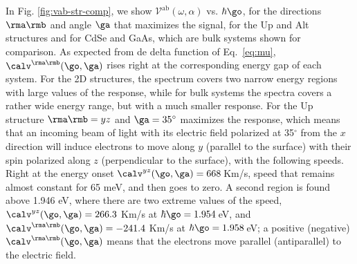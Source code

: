 \documentclass[floatfix,prb,aps,superscriptaddress,showpacs,11pt,preprint,letterpaper]{revtex4}
\begin{document}
In Fig. \ref{fig:vab-str-comp}, we show $\mathcal{V}^{\mathrm{ab}}
(\omega,\alpha)$ vs. $\hbar\go$, for the directions $\rma\rmb$ and angle $\ga$
that maximizes the signal, for the Up  and Alt structures and for CdSe and
GaAs, which are bulk systems shown for comparison.
% 
As expected from de delta function of Eq.~\eqref{eq:mu},
$\calv^{\rma\rmb}(\go,\ga)$ rises right at the corresponding energy gap of each
system. For the 2D structures, the spectrum covers two narrow energy regions
with large values of the response, while for bulk systems the spectra covers a
rather wide energy range, but with a much smaller response.
% 
For the Up structure $\rma\rmb=yz$ and $\ga=35^\circ$ maximizes the response,
which means that an incoming beam of light with its electric field polarized at
35$^\circ$ from the $x$ direction will induce electrons to move along $y$
(parallel to the surface) with their spin polarized along $z$ (perpendicular to
the surface), with the following speeds.
% 
Right at the energy onset $\calv^{yz}(\go,\ga)=668$\,Km/s, speed that remains
almost constant for 65 meV, and then goes to zero. A second region is found
above 1.946 eV, where there are two extreme values of the speed,
$\calv^{yz}(\go,\ga)=266.3$ Km/s at $\hbar\go=1.954$\,eV, and
$\calv^{\rma\rmb}(\go,\ga)=-241.4$ Km/s at $\hbar\go=1.958$\,eV; a positive
(negative) $\calv^{\rma\rmb}(\go,\ga)$ means that the electrons move parallel
(antiparallel) to the electric field.
\end{document}
